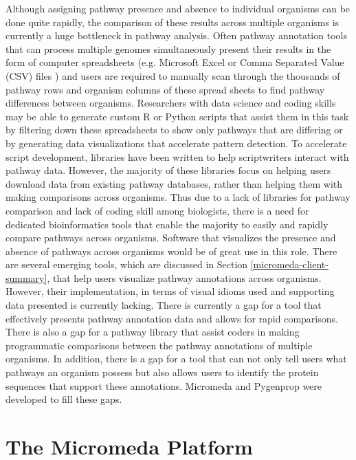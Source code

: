 Although assigning pathway presence and absence to individual organisms can be done quite rapidly, the comparison of these results across multiple organisms is currently a huge bottleneck in pathway analysis. Often pathway annotation tools that can process multiple genomes simultaneously present their results in the form of computer spreadsheets (e.g. Microsoft Excel or Comma Separated Value (CSV) files \cite{RFC4180}) and users are required to manually scan through the thousands of pathway rows and organism columns of these spread sheets to find pathway differences between organisms. Researchers with data science and coding skills may be able to generate custom R or Python scripts that assist them in this task by filtering down these spreadsheets to show only pathways that are differing or by generating data visualizations that accelerate pattern detection. To accelerate script development, libraries have been written to help scriptwriters interact with pathway data. However, the majority of these libraries focus on helping users download data from existing pathway databases, rather than helping them with making comparisons across organisms. Thus due to a lack of libraries for pathway comparison and lack of coding skill among biologists, there is a need for dedicated bioinformatics tools that enable the majority to easily and rapidly compare pathways across organisms. Software that visualizes the presence and absence of pathways across organisms would be of great use in this role. There are several emerging tools, which are discussed in Section \ref{micromeda-client-summary}, that help users visualize pathway annotations across organisms. However, their implementation, in terms of visual idioms used and supporting data presented is currently lacking. There is currently a gap for a tool that effectively presents pathway annotation data and allows for rapid comparisons. There is also a gap for a pathway library that assist coders in making programmatic comparisons between the pathway annotations of multiple organisms. In addition, there is a gap for a tool that can not only tell users what pathways an organism possess but also allows users to identify the protein sequences that support these annotations. Micromeda and Pygenprop were developed to fill these gaps.

\section{The Micromeda Platform}

